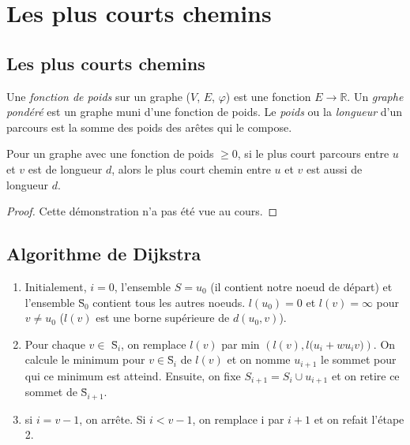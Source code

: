 \section{Les plus courts chemins}
\subsection{Les plus courts chemins}
\begin{mydef}
  Une \emph{fonction de poids} sur un graphe ($V$, $E$, $\varphi$) est une fonction $E \to \mathbb{R}$. Un \emph{graphe pondéré} est un graphe muni d’une fonction de poids. Le \emph{poids} ou la \emph{longueur} d’un parcours est la somme des poids des arêtes qui le compose.
\end{mydef}

\begin{mytheo} 
  Pour un graphe avec une fonction de poids $\geq 0$, si le plus court parcours entre $u$ et $v$ est de longueur $d$, alors le plus court chemin entre $u$ et $v$ est aussi de longueur $d$.
  \begin{proof}
     Cette démonstration n'a pas été vue au cours.
  \end{proof}
\end{mytheo}

\subsection{Algorithme de Dijkstra}
\begin{myalgo}
\noindent
\begin{enumerate}
  \item Initialement, $i=0$, l'ensemble $S={u_{0}}$ (il contient notre noeud de départ) et l'ensemble \={S}$_{0}$ contient tous les autres noeuds. $l(u_{0})=0$ et $l(v)=\infty$ pour $v\ne u_{0}$ ($l(v)$ est une borne supérieure de $d(u_{0},v)$).
	\item Pour chaque $v \in$ \=S$_{i}$, on remplace $l(v)$ par min $({l(v),l(u_{i}+w{u_{i}v)}})$. On calcule le minimum pour $v \in$\=S$_{i}$ de $l(v)$ et on nomme $u_{i+1}$ le sommet pour qui ce minimum est atteind. Ensuite, on fixe $S_{i+1}=S_{i} \cup {u_{i+1}}$ et on retire ce sommet de \=S$_{i+1}$.
	\item si $i=v-1$, on arrête. Si $i < v-1$, on remplace i par $i+1$ et on refait l'étape 2.
	\end{enumerate}
\end{myalgo}

